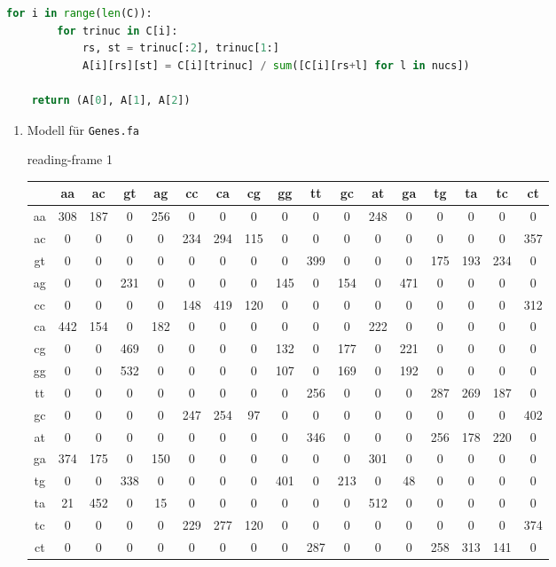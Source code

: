 \documentclass{homework}
\begin{document}
\begin{enumerate}
\begin{lstlisting}[language=python]
	for i in range(len(C)):
		for trinuc in C[i]:
			rs, st = trinuc[:2], trinuc[1:]
			A[i][rs][st] = C[i][trinuc] / sum([C[i][rs+l] for l in nucs])

	return (A[0], A[1], A[2])
\end{lstlisting}

\begin{enumerate}

\item Modell für \texttt{Genes.fa}

\tiny

\normalsize
reading-frame 1
\tiny

\begin{tabular}{c|cccccccccccccccc}
   & aa & ac & gt & ag & cc & ca & cg & gg & tt & gc & at & ga & tg & ta & tc & ct\\\hline
aa & 308 & 187 &   0 & 256 &   0 &   0 &   0 &   0 &   0 &   0 & 248 &   0 &   0 &   0 &   0 &   0\\
ac &   0 &   0 &   0 &   0 & 234 & 294 & 115 &   0 &   0 &   0 &   0 &   0 &   0 &   0 &   0 & 357\\
gt &   0 &   0 &   0 &   0 &   0 &   0 &   0 &   0 & 399 &   0 &   0 &   0 & 175 & 193 & 234 &   0\\
ag &   0 &   0 & 231 &   0 &   0 &   0 &   0 & 145 &   0 & 154 &   0 & 471 &   0 &   0 &   0 &   0\\
cc &   0 &   0 &   0 &   0 & 148 & 419 & 120 &   0 &   0 &   0 &   0 &   0 &   0 &   0 &   0 & 312\\
ca & 442 & 154 &   0 & 182 &   0 &   0 &   0 &   0 &   0 &   0 & 222 &   0 &   0 &   0 &   0 &   0\\
cg &   0 &   0 & 469 &   0 &   0 &   0 &   0 & 132 &   0 & 177 &   0 & 221 &   0 &   0 &   0 &   0\\
gg &   0 &   0 & 532 &   0 &   0 &   0 &   0 & 107 &   0 & 169 &   0 & 192 &   0 &   0 &   0 &   0\\
tt &   0 &   0 &   0 &   0 &   0 &   0 &   0 &   0 & 256 &   0 &   0 &   0 & 287 & 269 & 187 &   0\\
gc &   0 &   0 &   0 &   0 & 247 & 254 &  97 &   0 &   0 &   0 &   0 &   0 &   0 &   0 &   0 & 402\\
at &   0 &   0 &   0 &   0 &   0 &   0 &   0 &   0 & 346 &   0 &   0 &   0 & 256 & 178 & 220 &   0\\
ga & 374 & 175 &   0 & 150 &   0 &   0 &   0 &   0 &   0 &   0 & 301 &   0 &   0 &   0 &   0 &   0\\
tg &   0 &   0 & 338 &   0 &   0 &   0 &   0 & 401 &   0 & 213 &   0 &  48 &   0 &   0 &   0 &   0\\
ta &  21 & 452 &   0 &  15 &   0 &   0 &   0 &   0 &   0 &   0 & 512 &   0 &   0 &   0 &   0 &   0\\
tc &   0 &   0 &   0 &   0 & 229 & 277 & 120 &   0 &   0 &   0 &   0 &   0 &   0 &   0 &   0 & 374\\
ct &   0 &   0 &   0 &   0 &   0 &   0 &   0 &   0 & 287 &   0 &   0 &   0 & 258 & 313 & 141 &   0\\
\end{tabular}


\end{enumerate}
\end{enumerate}
\end{document}
